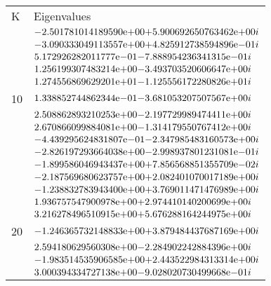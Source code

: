 \begin{enumerate}
\begin{figure}[tbh]
 \centering    
\begin{tabular}{ |p{1cm}|| p{10cm}|}
\hline
 K & Eigenvalues \\ \hhline{|=|=|}   
\hline
5 & ${-2.501781014189590}\mathrm{e}{+00 }  {+ 5.900692650763462}\mathrm{e}{+00i}$\\
  & ${-3.090333049113557}\mathrm{e}{+00 }  {+ 4.825912738594896}\mathrm{e}{-01i}$\\
  & ${ 5.172926282011777}\mathrm{e}{-01 }  {- 7.888954236341315}\mathrm{e}{-01i}$\\
  & ${ 1.256199307483214}\mathrm{e}{+00 }  {- 3.493703520606647}\mathrm{e}{+00i}$\\
  & ${ 1.274556869629201}\mathrm{e}{+01 }  {- 1.125556172280826}\mathrm{e}{+01i}$\\
\hline  
10& ${ 1.338852744862344}\mathrm{e}{-01}  {- 3.681053207507567}\mathrm{e}{+00i}$\\
  & ${ 2.508862893210253}\mathrm{e}{+00}  {- 2.197729989474411}\mathrm{e}{+00i}$\\
  & ${ 2.670866099884081}\mathrm{e}{+00}  {- 1.314179550767412}\mathrm{e}{+00i}$\\
  & ${-4.439295624831807}\mathrm{e}{-01}  {- 2.347985483160573}\mathrm{e}{+00i}$\\
  & ${-2.826197293664038}\mathrm{e}{+00}  {- 2.998937801231081}\mathrm{e}{-01i}$\\
  & ${-1.899586046943437}\mathrm{e}{+00}  {+ 7.856568851355709}\mathrm{e}{-02i}$\\
  & ${-2.187569680623757}\mathrm{e}{+00}  {+ 2.082401070017189}\mathrm{e}{+00i}$\\
  & ${-1.238832783943400}\mathrm{e}{+00}  {+ 3.769011471476989}\mathrm{e}{+00i}$\\
  & ${ 1.936757547900978}\mathrm{e}{+00}  {+ 2.974410140200699}\mathrm{e}{+00i}$\\
  & ${ 3.216278496510915}\mathrm{e}{+00}  {+ 5.676288164244975}\mathrm{e}{+00i}$\\
\hline  
20& ${-1.246365732148833}\mathrm{e}{+00}  {+ 3.879484437687169}\mathrm{e}{+00i}$\\
  & ${ 2.594180629560308}\mathrm{e}{+00}  {- 2.284902242884396}\mathrm{e}{+00i}$\\
  & ${-1.983514535906585}\mathrm{e}{+00}  {+ 2.443522984313314}\mathrm{e}{+00i}$\\
  & ${ 3.000394334727138}\mathrm{e}{+00}  {- 9.028020730499668}\mathrm{e}{-01i}$\\

\end{tabular}
\end{figure}
\end{enumerate}
